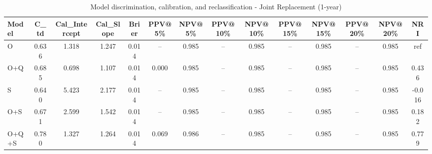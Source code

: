 \begin{table}[htbp]
\centering
\small
\caption{Model discrimination, calibration, and reclassification - Joint Replacement (1-year)}
\label{tab:perf_joint_1y}
\begin{tabular}{lccccccccccccc}
\toprule
Model & C\_td & Cal\_Intercept & Cal\_Slope & Brier & PPV@5\% & NPV@5\% & PPV@10\% & NPV@10\% & PPV@15\% & NPV@15\% & PPV@20\% & NPV@20\% & NRI \\
\midrule
O & 0.636 & 1.318 & 1.247 & 0.014 & -- & 0.985 & -- & 0.985 & -- & 0.985 & -- & 0.985 & ref \\
O+Q & 0.685 & 0.698 & 1.107 & 0.014 & 0.000 & 0.985 & -- & 0.985 & -- & 0.985 & -- & 0.985 & 0.436 \\
S & 0.640 & 5.423 & 2.177 & 0.014 & -- & 0.985 & -- & 0.985 & -- & 0.985 & -- & 0.985 & -0.016 \\
O+S & 0.671 & 2.599 & 1.542 & 0.014 & -- & 0.985 & -- & 0.985 & -- & 0.985 & -- & 0.985 & 0.182 \\
O+Q+S & 0.780 & 1.327 & 1.264 & 0.014 & 0.069 & 0.986 & -- & 0.985 & -- & 0.985 & -- & 0.985 & 0.779 \\
\bottomrule
\end{tabular}
\end{table}